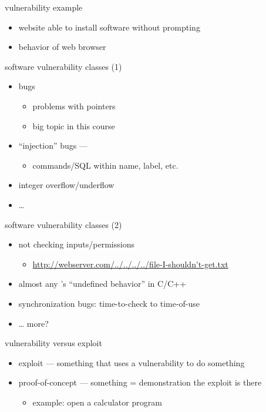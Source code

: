 \begin{frame}{vulnerability example}
    \begin{itemize}
    \item website able to install software without prompting
    \item {} behavior of web browser
    \end{itemize}
\end{frame}

\begin{frame}{software vulnerability classes (1)}
    \begin{itemize}
    \item {} bugs
        \begin{itemize}
        \item problems with pointers
        \item big topic in this course
        \end{itemize}
    \item ``injection'' bugs --- 
        \begin{itemize}
        \item commands/SQL within name, label, etc.
        \end{itemize}
    \item integer overflow/underflow
    \item \ldots
    \end{itemize}
\end{frame}

\begin{frame}{software vulnerability classes (2)}
    \begin{itemize}
    \item not checking inputs/permissions
        \begin{itemize}
        \item \url{http://webserver.com/../../../../file-I-shouldn't-get.txt}
        \end{itemize}
    \item almost any 's ``undefined behavior'' in C/C++
    \item synchronization bugs: time-to-check to time-of-use
    \item \ldots{} more?
    \end{itemize}
\end{frame}

\begin{frame}{vulnerability versus exploit}
    \begin{itemize}
    \item exploit --- something that uses a vulnerability to do something
    \item proof-of-concept --- something = demonstration the exploit is there
        \begin{itemize}
        \item example: open a calculator program
        \end{itemize}
    \end{itemize}
\end{frame}

